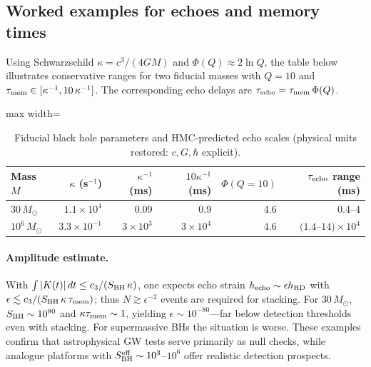 \documentclass[a4paper,11pt]{article}
\newcommand{\HMC}{\textup{\textsc{HMC}}\xspace}
\theoremstyle{plain}
\theoremstyle{definition}
\theoremstyle{remark}
\begin{document}
\subsection*{Worked examples for echoes and memory times}
Using Schwarzschild $\kappa=c^3/(4GM)$ and $\Phi(Q)\approx 2\ln Q$, the table below illustrates
conservative ranges for two fiducial masses with $Q=10$ and $\tau_{\rm mem}\in[\kappa^{-1},10\,\kappa^{-1}]$.
The corresponding echo delays are $\tau_{\rm echo}=\tau_{\rm mem}\,\Phi(Q)$.
\begin{table}[htbp]
\centering
\caption{Fiducial black hole parameters and \HMC{}-predicted echo scales (physical units restored: $c,G,\hbar$ explicit).}
\label{tab:echo-worked-examples}
\footnotesize
\begin{adjustbox}{max width=\textwidth}
\begin{tabular}{l r r r r r}
\toprule
\textbf{Mass $M$} & \textbf{$\kappa$ (s$^{-1}$)} & \textbf{$\kappa^{-1}$ (ms)} & \textbf{$10\kappa^{-1}$ (ms)} & \textbf{$\Phi(Q{=}10)$} & \textbf{$\tau_{\rm echo}$ range (ms)} \\
\midrule
$30\,M_\odot$ & $1.1\times 10^4$ & 0.09 & 0.9 & 4.6 & $0.4$--$4$ \\
$10^6\,M_\odot$ & $3.3\times 10^{-1}$ & $3\times 10^3$ & $3\times 10^4$ & 4.6 & $(1.4$--$14)\times 10^4$ \\
\bottomrule
\end{tabular}
\end{adjustbox}
\vspace{0.5em}
\end{table}
\paragraph{Amplitude estimate.}
With $\int |K(t)|\,dt\le c_3/(S_{\rm BH}\,\kappa)$, one expects echo strain $h_{\rm echo}\sim \epsilon h_{\rm RD}$ with
$\epsilon\lesssim c_3/(S_{\rm BH}\,\kappa\,\tau_{\rm mem})$; thus $N\gtrsim \epsilon^{-2}$ events are required for stacking.
For $30\,M_\odot$, $S_{\rm BH}\sim 10^{80}$ and $\kappa\tau_{\rm mem}\sim 1$, yielding $\epsilon\sim 10^{-80}$---far below detection thresholds even with stacking. For supermassive BHs the situation is worse. These examples confirm that astrophysical GW tests serve primarily as null checks, while analogue platforms with $S_{\rm BH}^{\rm eff}\sim 10^3$--$10^6$ offer realistic detection prospects.
\end{document}
